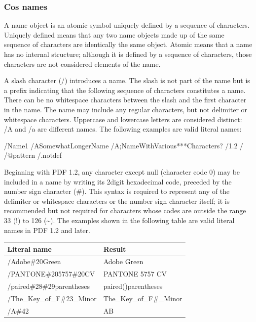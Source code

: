 \documentclass[letterpaper,12pt,english,openany,oneside]{sphinxmanual}
\begin{document}
\subsubsection{Cos names}
\label{\detokenize{Plugins_Cos:cos-names}}
A name object is an atomic symbol uniquely defined by a sequence of characters. Uniquely defined means that any two name objects made up of the same sequence of characters are identically the same object. Atomic means that a name has no internal structure; although it is defined by a sequence of characters, those characters are not considered elements of the name.

\begin{sphinxVerbatim}[commandchars=\\\{\}]
\end{sphinxVerbatim}

A slash character (/) introduces a name. The slash is not part of the name but is a prefix indicating that the following sequence of characters constitutes a name. There can be no white\sphinxhyphen{}space characters between the slash and the first character in the name. The name may include any regular characters, but not delimiter or white\sphinxhyphen{}space characters. Uppercase and lowercase letters are considered distinct: /A and /a are different names. The following examples are valid literal names:

\begin{sphinxVerbatim}[commandchars=\\\{\}]
/Name1
  /ASomewhatLongerName
  /A;Name\PYGZus{}With\PYGZhy{}Various***Characters?
  /1.2
  /\PYGZdl{}\PYGZdl{}
  /@pattern
  /.notdef
\end{sphinxVerbatim}

Beginning with PDF 1.2, any character except null (character code 0) may be included in a name by writing its 2\sphinxhyphen{}digit hexadecimal code, preceded by the number sign character (\#). This syntax is required to represent any of the delimiter or white\sphinxhyphen{}space characters or the number sign character itself; it is recommended but not required for characters whose codes are outside the range 33 (!) to 126 (\textasciitilde{}). The examples shown in the following table are valid literal names in PDF 1.2 and later.


\begin{savenotes}\sphinxattablestart
\centering
{}\label{\detokenize{Plugins_Cos:section-1}}\nobreak
\begin{tabulary}{\linewidth}[t]{|T|T|}
\hline
\sphinxstyletheadfamily 
Literal name
&\sphinxstyletheadfamily 
Result
\\
\hline
/Adobe\#20Green
&
Adobe Green
\\
\hline
/PANTONE\#205757\#20CV
&
PANTONE 5757 CV
\\
\hline
/paired\#28\#29parentheses
&
paired()parentheses
\\
\hline
/The\_Key\_of\_F\#23\_Minor
&
The\_Key\_of\_F\#\_Minor
\\
\hline
/A\#42
&
AB
\\
\hline
\end{tabulary}
\par
\sphinxattableend\end{savenotes}
\end{document}
